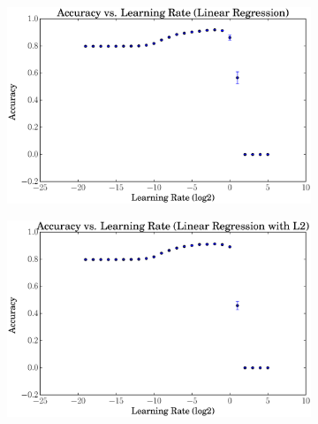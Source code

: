 \documentclass[a4paper, 12pt]{article}
\begin{document}
\begin{figure}[htpb]
    \centering
    \begin{subfigure}[htpb]{0.45\textwidth}
        \includegraphics[width=\textwidth]{acc_vs_rate_linreg}
        \caption{}
        \label{fig:rate_lingreg}
    \end{subfigure}
    \begin{subfigure}[htpb]{0.45\textwidth}
        \includegraphics[width=\textwidth]{acc_vs_rate_linregL2}
        \caption{}
        \label{fig:rate_linregL2}
    \end{subfigure}
    \hfill %
    \begin{subfigure}[htpb]{0.45\textwidth}

\end{subfigure}
\end{figure}
\end{document}
